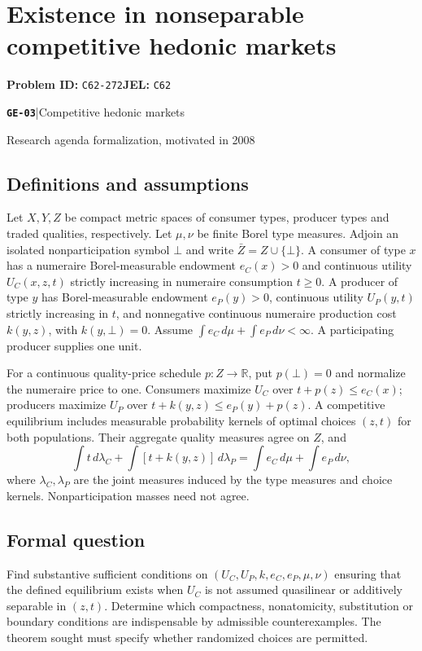 \documentclass[11pt,a4paper]{article}
\newcommand{\R}{\mathbb R}
\newcommand{\entrymeta}[3]{{\sffamily\small\color{muted}\textbf{\texttt{#1}}\quad|\quad #2\par #3\par}}
\begin{document}
\section*{Existence in nonseparable competitive hedonic markets}
\textbf{Problem ID:} \texttt{C62-272}\quad \textbf{JEL:} \texttt{C62}\par
\label{problem:OP-0575}
\label{beyond:GE-03}
\entrymeta{GE-03}{Competitive hedonic markets}{Research agenda formalization, motivated in 2008}
\subsection*{Definitions and assumptions}
Let $X,Y,Z$ be compact metric spaces of consumer types, producer types and traded qualities, respectively. Let $\mu,\nu$ be finite Borel type measures. Adjoin an isolated nonparticipation symbol $\bot$ and write $\bar Z=Z\cup\{\bot\}$. A consumer of type $x$ has a numeraire Borel-measurable endowment $e_C(x)>0$ and continuous utility $U_C(x,z,t)$ strictly increasing in numeraire consumption $t\ge0$. A producer of type $y$ has Borel-measurable endowment $e_P(y)>0$, continuous utility $U_P(y,t)$ strictly increasing in $t$, and nonnegative continuous numeraire production cost $k(y,z)$, with $k(y,\bot)=0$. Assume $\int e_C\,d\mu+\int e_P\,d\nu<\infty$. A participating producer supplies one unit.

For a continuous quality-price schedule $p:Z\to\R$, put $p(\bot)=0$ and normalize the numeraire price to one. Consumers maximize $U_C$ over $t+p(z)\le e_C(x)$; producers maximize $U_P$ over $t+k(y,z)\le e_P(y)+p(z)$. A competitive equilibrium includes measurable probability kernels of optimal choices $(z,t)$ for both populations. Their aggregate quality measures agree on $Z$, and
\[
 \int t\,d\lambda_C+\int[t+k(y,z)]\,d\lambda_P
 =\int e_C\,d\mu+\int e_P\,d\nu,
\]
where $\lambda_C,\lambda_P$ are the joint measures induced by the type measures and choice kernels. Nonparticipation masses need not agree.
\subsection*{Formal question}
Find substantive sufficient conditions on $(U_C,U_P,k,e_C,e_P,\mu,\nu)$ ensuring that the defined equilibrium exists when $U_C$ is not assumed quasilinear or additively separable in $(z,t)$. Determine which compactness, nonatomicity, substitution or boundary conditions are indispensable by admissible counterexamples. The theorem sought must specify whether randomized choices are permitted.
\end{document}
